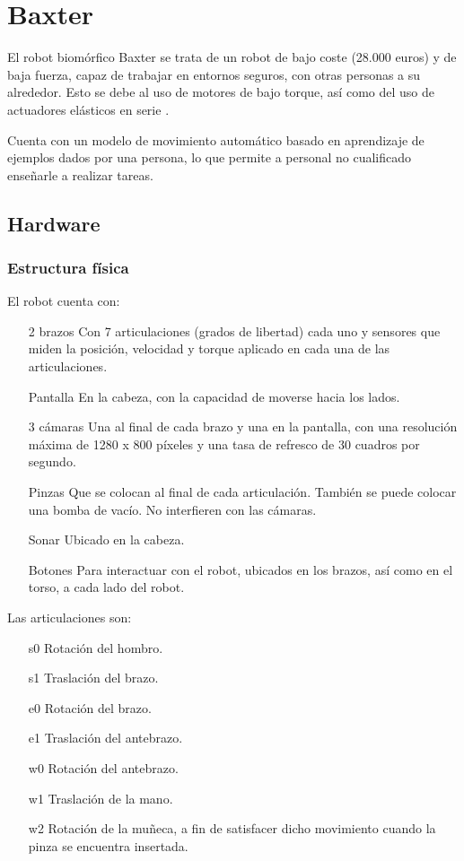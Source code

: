 \section{Baxter}
El robot biomórfico Baxter se trata de un robot de bajo coste (28.000 euros) y de baja fuerza, capaz de trabajar en entornos seguros, con otras personas a su alrededor. Esto se debe al uso de motores de bajo torque, así como del uso de actuadores elásticos en serie \cite{pratt1995series}.

Cuenta con un modelo de movimiento automático basado en aprendizaje de ejemplos dados por una persona, lo que permite a personal no cualificado enseñarle a realizar tareas.
\subsection{Hardware}
\subsubsection{Estructura física}
El robot cuenta con:

\begin{itemize}
\item [2 brazos] Con 7 articulaciones (grados de libertad) cada uno y sensores que miden la posición, velocidad y torque aplicado en cada una de las articulaciones.
\item [Pantalla] En la cabeza, con la capacidad de moverse hacia los lados.
\item [3 cámaras] Una al final de cada brazo y una en la pantalla, con una resolución máxima de 1280 x 800 píxeles y una tasa de refresco de 30 cuadros por segundo. 
\item [Pinzas] Que se colocan al final de cada articulación. También se puede colocar una bomba de vacío. No interfieren con las cámaras.
\item [Sonar] Ubicado en la cabeza.
\item [Botones] Para interactuar con el robot, ubicados en los brazos, así como en el torso, a cada lado del robot.
\end{itemize}

Las articulaciones son:

\begin{itemize}
\item[s0] Rotación del hombro.
\item[s1] Traslación del brazo.
\item[e0] Rotación del brazo.
\item[e1] Traslación del antebrazo.
\item[w0] Rotación del antebrazo.
\item[w1] Traslación de la mano.
\item[w2] Rotación de la muñeca, a fin de satisfacer dicho movimiento cuando la pinza se encuentra insertada.
\end{itemize}


